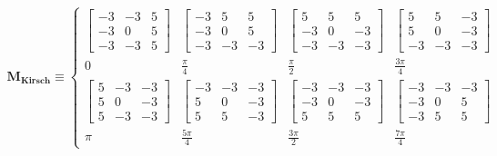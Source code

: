 \begin{eqnarray}
	\mathbf{M_{Kirsch}} \equiv \left\{ 
	\begin{array}{cccc} 
	\left[ \begin{array}{ccc}  -3 & -3 & 5  \\  -3 & 0 & 5 \\ -3 & -3 & 5 \end{array} \right] &
	\left[ \begin{array}{ccc}  -3 & 5 & 5  \\  -3 & 0 & 5 \\ -3 & -3 & -3 \end{array} \right] &
	\left[ \begin{array}{ccc}  5 & 5 & 5  \\  -3 & 0 & -3 \\ -3 & -3 & -3 \end{array} \right] &
	\left[ \begin{array}{ccc}  5 & 5 & -3  \\  5 & 0 & -3 \\ -3 & -3 & -3 \end{array} \right]
	\\ 0 & \frac{\pi}{4} & \frac{\pi}{2} & \frac{3 \pi}{4}
	\\ \nonumber
	 \left[ \begin{array}{ccc}  5 & -3 & -3  \\  5 & 0 & -3 \\ 5 & -3 & -3 \end{array} \right] &
	 \left[ \begin{array}{ccc}  -3 & -3 & -3  \\  5 & 0 & -3 \\ 5 & 5 & -3 \end{array} \right] &
	 \left[ \begin{array}{ccc}  -3 & -3 & -3  \\  -3 & 0 & -3 \\ 5 & 5 & 5 \end{array} \right] &
	 \left[ \begin{array}{ccc}  -3 & -3 & -3  \\  -3 & 0 & 5 \\ -3 & 5 & 5 \end{array} \right]
	\\ \pi & \frac{5 \pi}{4} & \frac{3 \pi}{2} & \frac{7 \pi}{4}
	\end{array} \right. 
\label{EqLXXXIII}
\end{eqnarray}

